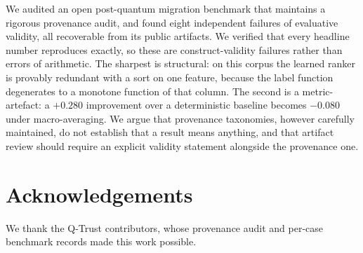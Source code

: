 \documentclass[conference]{IEEEtran}
\begin{document}
We audited an open post-quantum migration benchmark that maintains a rigorous provenance
audit, and found eight independent failures of evaluative validity, all recoverable from
its public artifacts. We verified that every headline number reproduces exactly, so these
are construct-validity failures rather than errors of arithmetic. The sharpest is
structural: on this corpus the learned ranker is provably redundant with a sort on one
feature, because the label function degenerates to a monotone function of that column.
The second is a metric-artefact: a $+0.280$ improvement over a deterministic baseline
becomes $-0.080$ under macro-averaging. We argue that provenance taxonomies, however
carefully maintained, do not establish that a result means anything, and that artifact
review should require an explicit validity statement alongside the provenance one.

\section*{Acknowledgements}
We thank the Q-Trust contributors, whose provenance audit and per-case benchmark records
made this work possible.
\end{document}
